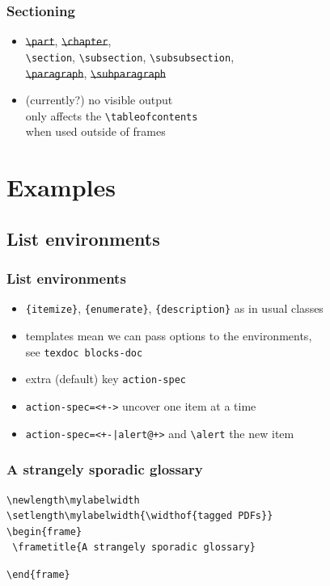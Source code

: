 \documentclass{ltx-talk}
\newcommand{\cs}[1]{\texttt{\textbackslash #1}}
\newcommand{\tubbraced}[1]{\texttt{\{#1\}}}
\begin{document}

\begin{frame}
\frametitle{Sectioning}
\begin{itemize}
\item \sout{\cs{part}}, \sout{\cs{chapter}},\\
\cs{section}, \cs{subsection}, \cs{subsubsection},\\
\sout{\cs{paragraph}}, \sout{\cs{subparagraph}}
\item (currently?) no visible output\\
\qquad only affects the \cs{tableofcontents}\\
\qquad when used outside of frames
\end{itemize}
\end{frame}

\section{Examples}

\subsection{List environments}

\begin{frame*}
\frametitle{List environments}
\begin{itemize}
\item \tubbraced{itemize}, \tubbraced{enumerate}, \tubbraced{description}
as in usual classes
\item templates mean we can pass options to the environments,\\
see \texttt{texdoc blocks-doc}
\item extra (default) key \texttt{action-spec}
\item \verb!action-spec=<+->! \qquad uncover one item at a time
\item \verb!action-spec=<+-|alert@+>!
\qquad and \alert{\cs{alert}} the new item
\end{itemize}
\end{frame*}

\newlength\mylabelwidth
\setlength{}
\begin{frame*}
  \frametitle{A strangely sporadic glossary}
 \begin{minipage}{.52\textwidth}
 \lstset{aboveskip=0pt,belowskip=0pt}
 \begin{lstlisting}
\newlength\mylabelwidth
\setlength\mylabelwidth{\widthof{tagged PDFs}}
\begin{frame}
 \frametitle{A strangely sporadic glossary}
\end{lstlisting}
%
\begin{lstlisting}
\end{frame}
\end{lstlisting}
 \end{minipage}%
 \begin{minipage}{.48\textwidth}

\end{minipage}
\end{frame*}
\end{document}
